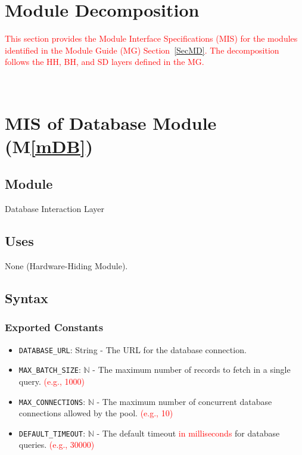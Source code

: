 \documentclass[12pt, titlepage]{article}
\providecommand{\mref}[1]{M\ref{#1}}
\begin{document}
\section{Module Decomposition}
\textcolor{red}{This section provides the Module Interface Specifications (MIS) for the modules identified in the Module Guide (MG) Section~\ref{SecMD}. The decomposition follows the HH, BH, and SD layers defined in the MG.}

\newpage
~\newpage

\section{MIS of Database Module (\mref{mDB})}

\subsection{Module}
Database Interaction Layer

\subsection{Uses}
None (Hardware-Hiding Module).

\subsection{Syntax}
\subsubsection{Exported Constants}
\begin{itemize}
    \item \texttt{DATABASE\_URL}: String - The URL for the database connection.
    \item \texttt{MAX\_BATCH\_SIZE}: $\mathbb{N}$ - The maximum number of records to fetch in a single query. \textcolor{red}{(e.g., 1000)}
    \item \texttt{MAX\_CONNECTIONS}: $\mathbb{N}$ - The maximum number of concurrent database connections allowed by the pool. \textcolor{red}{(e.g., 10)}
    \item \texttt{DEFAULT\_TIMEOUT}: $\mathbb{N}$ - The default timeout \textcolor{red}{in milliseconds} for database queries. \textcolor{red}{(e.g., 30000)}
\end{itemize}
\end{document}

